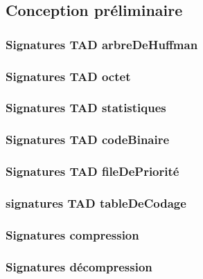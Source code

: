 \subsection{Conception préliminaire}

\subsubsection{Signatures TAD arbreDeHuffman}


\subsubsection{Signatures TAD octet}


\subsubsection{Signatures TAD statistiques}


\subsubsection{Signatures TAD codeBinaire}


\subsubsection{Signatures TAD fileDePriorité}


\subsubsection{signatures TAD tableDeCodage}


\subsubsection{Signatures compression}


\subsubsection{Signatures décompression}

